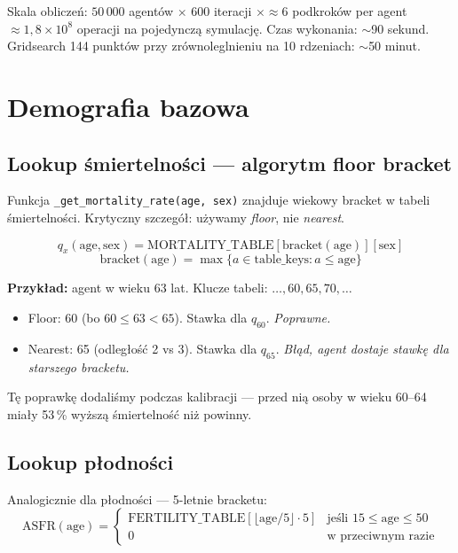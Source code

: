 \documentclass[11pt,a4paper]{article}
\begin{document}
Skala obliczeń: $50\,000$ agentów $\times$ 600 iteracji $\times \approx 6$ podkroków per agent $\approx 1{,}8 \times 10^8$ operacji na pojedynczą symulację. Czas wykonania: $\sim$90 sekund. Gridsearch 144 punktów przy zrównoleglnieniu na 10 rdzeniach: $\sim$50 minut.

\newpage
\section{Demografia bazowa}

\subsection{Lookup śmiertelności --- algorytm floor bracket}

Funkcja \texttt{\_get\_mortality\_rate(age, sex)} znajduje wiekowy bracket w tabeli śmiertelności. Krytyczny szczegół: używamy \emph{floor}, nie \emph{nearest}.

\begin{formulabox}
\[
q_x(\text{age}, \text{sex}) = \text{MORTALITY\_TABLE}[\text{bracket}(\text{age})][\text{sex}]
\]
\[
\text{bracket}(\text{age}) = \max\{a \in \text{table\_keys} : a \leq \text{age}\}
\]
\end{formulabox}

\textbf{Przykład:} agent w wieku 63 lat. Klucze tabeli: $\ldots, 60, 65, 70, \ldots$
\begin{itemize}
  \item Floor: 60 (bo $60 \leq 63 < 65$). Stawka dla $q_{60}$. \emph{Poprawne.}
  \item Nearest: 65 (odległość 2 vs 3). Stawka dla $q_{65}$. \emph{Błąd, agent dostaje stawkę dla \emph{starszego} bracketu.}
\end{itemize}

Tę poprawkę dodaliśmy podczas kalibracji --- przed nią osoby w wieku 60--64 miały 53\,\% wyższą śmiertelność niż powinny.

\subsection{Lookup płodności}

Analogicznie dla płodności --- 5-letnie bracketu:
\[
\mathrm{ASFR}(\text{age}) = \begin{cases}
\mathrm{FERTILITY\_TABLE}[\lfloor \text{age} / 5 \rfloor \cdot 5] & \text{jeśli } 15 \leq \text{age} \leq 50 \\
0 & \text{w przeciwnym razie}
\end{cases}
\]
\end{document}
